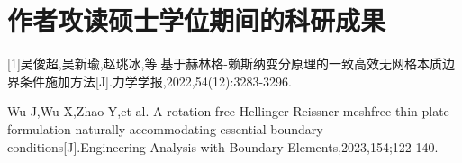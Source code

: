 \rmfamily\fontsize{10.5pt}{16pt}\selectfont
\setlength{\parindent}{0pt}
\chapter*{作者攻读硕士学位期间的科研成果}
[1]吴俊超,吴新瑜,赵珧冰,等.基于赫林格-赖斯纳变分原理的一致高效无网格本质边界条件施加方法[J].力学学报,2022,54(12):3283-3296.
\par
[2] Wu J,Wu X,Zhao Y,et al. A rotation-free Hellinger-Reissner meshfree thin plate formulation naturally accommodating essential boundary conditions[J].Engineering Analysis with Boundary Elements,2023,154;122-140.
    
